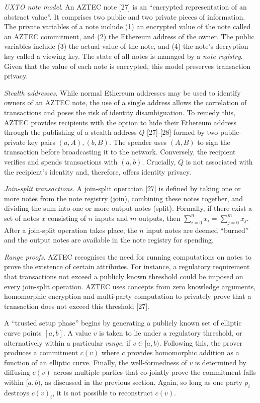 \textit{UXTO note model}. An AZTEC note [27] is an ``encrypted representation of an abstract value''. It comprises two public and two private pieces of information. The private variables of a note include (1) an encrypted value of the note called an AZTEC commitment, and (2) the Ethereum address of the owner. The public variables include (3) the actual value of the note, and (4) the note's decryption key called a viewing key. The state of all notes is managed by a \textit{note registry}. Given that the value of each note is encrypted, this model preserves transaction privacy.

\textit{Stealth addresses}. While normal Ethereum addresses may be used to identify owners of an AZTEC note, the use of a single address allows the correlation of transactions and poses the risk of identity disambiguation. To remedy this, AZTEC provides recipients with the option to hide their Ethereum address through the publishing of a stealth address $Q$ [27]-[28] formed by two public-private key pairs $(a, A), (b, B)$. The spender uses $(A, B)$ to sign the transaction before broadcasting it to the network. Conversely, the recipient verifies and spends transactions with $(a, b)$. Crucially, $Q$ is not associated with the recipient's identity and, therefore, offers identity privacy.

\textit{Join-split transactions}. A join-split operation [27] is defined by taking one or more notes from the note registry (join), combining these notes together, and dividing the sum into one or more output notes (split). Formally, if there exist a set of notes $x$ consisting of $n$ inputs and $m$ outputs, then $\sum_{i=0}^{n} x_i  = \sum_{j=0}^{m} x_j$. After a join-split operation takes place, the $n$ input notes are deemed ``burned'' and the output notes are available in the note registry for spending.

\textit{Range proofs}. AZTEC recognises the need for running computations on notes to prove the existence of certain attributes. For instance, a regulatory requirement that transactions not exceed a publicly known threshold could be imposed on every join-split operation. AZTEC uses concepts from zero knowledge arguments, homomorphic encryption and multi-party computation to privately prove that a transaction does not exceed this threshold [27]. 

A ``trusted setup phase'' begins by generating a publicly known set of elliptic curve points $[a, b]$. A value $v$ is taken to lie under a regulatory threshold, or alternatively within a particular \textit{range}, if $v \in [a, b)$. Following this, the prover produces a commitment $c(v)$ where $c$ provides homomorphic addition as a function of an elliptic curve. Finally, the well-formedness of $v$ is determined by diffusing $c(v)$ across multiple parties that co-jointly prove the commitment falls within $[a,b)$, as discussed in the previous section. Again, so long as one party $p_i$ destroys $c(v)_i$, it is not possible to reconstruct $c(v)$.
